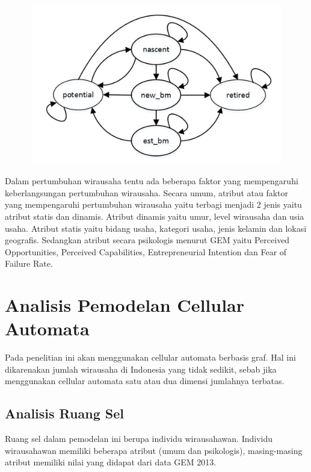 \begin{figure} [H]
	\centering  
	\includegraphics[width=14cm, height=7cm]{tingkatwirausaha} 
	\label{fig:prosesWirausaha} 
\end{figure}


Dalam pertumbuhan wirausaha tentu ada beberapa faktor yang mempengaruhi keberlangsungan pertumbuhan wirausaha. Secara umum, atribut atau faktor yang mempengaruhi pertumbuhan wirausaha yaitu terbagi menjadi 2 jenis yaitu atribut statis dan dinamis. Atribut dinamis yaitu umur, level wirausaha dan usia usaha. Atribut statis yaitu bidang usaha, kategori usaha, jenis kelamin dan lokasi geografis. Sedangkan atribut secara psikologis menurut GEM yaitu Perceived Opportunities, Perceived Capabilities, Entrepreneurial Intention dan Fear of Failure Rate. 


\section{Analisis Pemodelan Cellular Automata}
\label{analisisCA}
Pada penelitian ini akan menggunakan cellular automata berbasis graf. Hal ini dikarenakan jumlah wirausaha di Indonesia yang tidak sedikit, sebab jika menggunakan cellular automata satu atau dua dimensi jumlahnya terbatas.

\subsection{Analisis Ruang Sel}
Ruang sel dalam pemodelan ini berupa individu wirausahawan. Individu wirausahawan memiliki beberapa atribut (umum dan psikologis), masing-masing atribut memiliki nilai yang didapat dari data GEM 2013.


